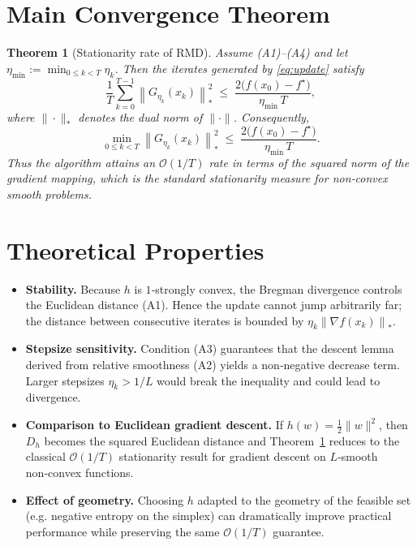 \documentclass{article}
\newtheorem{theorem}{Theorem}
\newcommand{\grad}{\nabla}
\newcommand{\Dh}{D_h}
\newcommand{\norm}[1]{\left\|#1\right\|}
\begin{document}
\section*{Main Convergence Theorem}
\begin{theorem}[Stationarity rate of RMD]
\label{thm:main}
Assume (A1)–(A4) and let $\eta_{\min}:=\min_{0\le k<T}\eta_k$. Then the iterates generated by \eqref{eq:update} satisfy
\[
\frac{1}{T}\sum_{k=0}^{T-1}\norm{G_{\eta_k}(x_k)}_{*}^{2}
\;\le\;
\frac{2\bigl(f(x_0)-f^{\star}\bigr)}{\eta_{\min}\,T},
\tag{1}
\]
where $\|\cdot\|_{*}$ denotes the dual norm of $\|\cdot\|$.
Consequently,
\[
\min_{0\le k<T}\norm{G_{\eta_k}(x_k)}_{*}^{2}
\;\le\;
\frac{2\bigl(f(x_0)-f^{\star}\bigr)}{\eta_{\min}\,T}.
\]
Thus the algorithm attains an $\mathcal{O}(1/T)$ rate in terms of the squared norm of the gradient mapping, which is the standard stationarity measure for non‑convex smooth problems.
\end{theorem}

\section*{Theoretical Properties}
\begin{itemize}
\item \textbf{Stability.} Because $h$ is $1$‑strongly convex, the Bregman divergence controls the Euclidean distance (A1). Hence the update cannot jump arbitrarily far; the distance between consecutive iterates is bounded by $\eta_k\norm{\grad f(x_k)}_{*}$.

\item \textbf{Stepsize sensitivity.} Condition (A3) guarantees that the descent lemma derived from relative smoothness (A2) yields a non‑negative decrease term. Larger stepsizes $ \eta_k>1/L$ would break the inequality and could lead to divergence.

\item \textbf{Comparison to Euclidean gradient descent.} If $h(w)=\tfrac12\|w\|^{2}$, then $\Dh$ becomes the squared Euclidean distance and Theorem~\ref{thm:main} reduces to the classical $\mathcal{O}(1/T)$ stationarity result for gradient descent on $L$‑smooth non‑convex functions.

\item \textbf{Effect of geometry.} Choosing $h$ adapted to the geometry of the feasible set (e.g. negative entropy on the simplex) can dramatically improve practical performance while preserving the same $\mathcal{O}(1/T)$ guarantee.
\end{itemize}
\end{document}
